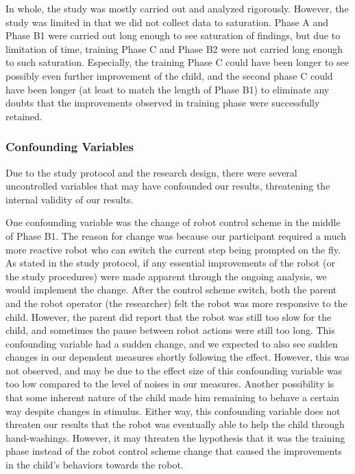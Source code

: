 In whole, the study was mostly carried out and analyzed rigorously.  However, the study was limited in that we did not collect data to saturation.  Phase A and Phase B1 were carried out long enough to see saturation of findings, but due to limitation of time, training Phase C and Phase B2 were not carried long enough to such saturation.  Especially, the training Phase C could have been longer to see possibly even further improvement of the child, and the second phase C could have been longer (at least to match the length of Phase B1) to eliminate any doubts that the improvements observed in training phase were successfully retained.

\subsubsection{Confounding Variables}
Due to the study protocol and the research design, there were several uncontrolled variables that may have confounded our results, threatening the internal validity of our results.

One confounding variable was the change of robot control scheme in the middle of Phase B1.  The reason for change was because our participant required a much more reactive robot who can switch the current step being prompted on the fly.  As stated in the study protocol, if any essential improvements of the robot (or the study procedures) were made apparent through the ongoing analysis, we would implement the change.  After the control scheme switch, both the parent and the robot operator (the researcher) felt the robot was more responsive to the child.  However, the parent did report that the robot was still too slow for the child, and sometimes the pause between robot actions were still too long.  This confounding variable had a sudden change, and we expected to also see sudden changes in our dependent measures shortly following the effect.  However, this was not observed, and may be due to the effect size of this confounding variable was too low compared to the level of noises in our measures.  Another possibility is that some inherent nature of the child made him remaining to behave a certain way despite changes in stimulus.  Either way, this confounding variable does not threaten our results that the robot was eventually able to help the child through hand-washings.  However, it may threaten the hypothesis that it was the training phase instead of the robot control scheme change that caused the improvements in the child's behaviors towards the robot.

